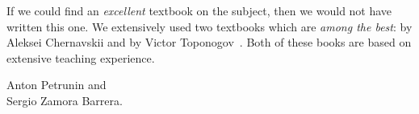 If we could find an \emph{excellent} textbook on the subject, then we would not have written this one.
We extensively used two textbooks which are \emph{among the best}: by Aleksei Chernavskii \cite{chernavsky} and by Victor Toponogov~\cite{toponogov-book}.
Both of these books are based on extensive teaching experience.


\begin{flushright}
Anton Petrunin and\\
Sergio Zamora Barrera.
\end{flushright}



\newpage
\tableofcontents
